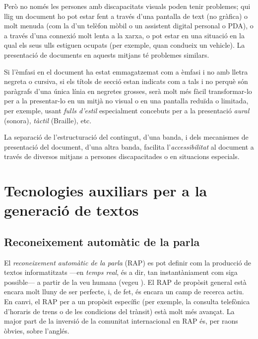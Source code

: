 Però no només les persones amb discapacitats visuals poden tenir
problemes; qui llig un document ho pot estar fent a través d'una
pantalla de text (no gràfica) o molt menuda (com la d'un telèfon mòbil
o un assistent digital personal o PDA), o a través d'una connexió molt
lenta a la xarxa, o pot estar en una situació en la qual els seus ulls
estiguen ocupats (per exemple, quan condueix un vehicle). La
presentació de documents en aquests mitjans té problemes similars.

Si l'èmfasi en el document ha estat emmagatzemat com a èmfasi i no amb
lletra negreta o cursiva, si els títols de secció estan indicats com a
tals i no perquè són paràgrafs d'una única línia en negretes grosses,
serà molt més fàcil transformar-lo per a la presentar-lo en un mitjà
no visual o en una pantalla reduïda o limitada, per exemple, usant
\emph{fulls d'estil} especialment concebuts per a la presentació
\emph{aural} (sonora), \emph{tàctil} (Braille), etc.

La separació de l'estructuració del contingut, d'una banda, i dels
mecanismes de presentació del document, d'una altra banda, facilita
l'\emph{accessibilitat} al document a través de diversos mitjans a
persones discapacitades o en situacions especials.

 
\section{Tecnologies auxiliars per a la generació de textos}


\subsection{Reconeixement automàtic de la parla}
\label{ss:recparla}

El \emph{reconeixement automàtic de la parla} (RAP) es pot definir
com la producció de textos informatitzats ---en \emph{temps real}, és
a dir, tan instantàniament com siga possible--- a partir de la veu
humana (vegeu \citealt{samuelson-brown96b}). El RAP de propòsit general
està encara molt lluny de ser perfecte, i, de fet, és encara un camp
de recerca actiu.  En canvi, el RAP per a un propòsit específic (per
exemple, la consulta telefònica d'horaris de trens o de les condicions del
trànsit) està molt més
avançat. La major part de la inversió de la comunitat internacional en
RAP és, per raons òbvies, sobre l'anglés.

